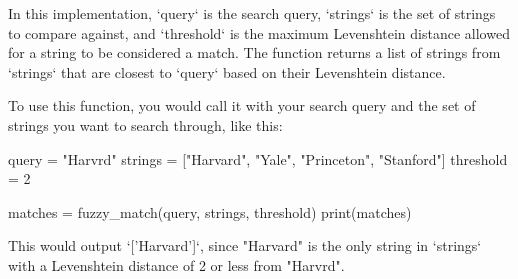 \documentclass[
	a4paper, %
	10pt, %
	unnumberedsections, %
	twoside, %
]{LTJournalArticle}
\begin{document}
In this implementation, `query` is the search query, `strings` is the set of strings to compare against, and `threshold` is the maximum Levenshtein distance allowed for a string to be considered a match. The function returns a list of strings from `strings` that are closest to `query` based on their Levenshtein distance.

To use this function, you would call it with your search query and the set of strings you want to search through, like this:

\begin{python}
	query = "Harvrd"
	strings = ["Harvard", "Yale", 
	"Princeton", "Stanford"]
	threshold = 2

	matches = fuzzy_match(query, 
	strings, threshold)
	print(matches)
\end{python}

This would output `['Harvard']`, since "Harvard" is the only string in `strings` with a Levenshtein distance of 2 or less from "Harvrd".








\end{document}
